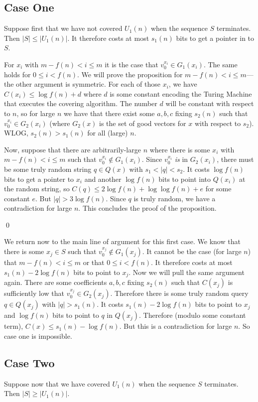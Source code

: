 \documentclass{article}
\begin{document}
\subsection{Case One} Suppose first that we have not covered $U_1(n)$ when the sequence $S$ terminates. Then $|S| \leq |U_1(n)|$. It therefore costs at most $s_1(n)$ bits to get a pointer in to $S$. 

\propnonum For $x_i$ with $m - f(n) < i \leq m$ it is the case that $v_0^{x_i} \in G_1(x_i)$. The same holds for $0 \leq i < f(n)$.
\proof 
We will prove the proposition for $m - f(n) < i \leq m$---the other argument is symmetric. For each of those $x_i$, we have $C(x_i) \leq \log f(n) + d$ where $d$ is some constant encoding the Turing Machine that executes the covering algorithm. The number $d$ will be constant with respect to $n$, so for large $n$ we have that there exist some $a,b,c$ fixing $s_2(n)$ such that $v_0^{x_i} \in G_2(x_i)$ (where $G_2(x)$ is the set of good vectors for $x$ with respect to $s_2$). WLOG, $s_2(n) > s_1(n)$ for all (large) $n$. 

Now, suppose that there are arbitrarily-large $n$ where there is some $x_i$ with $m - f(n) < i \leq m$ such that $v_0^{x_i} \notin G_1(x_i)$. Since $v_0^{x_i}$ \emph{is} in $G_2(x_i)$, there must be some truly random string $q \in Q(x)$ with $s_1 < |q| < s_2$. It costs $\log f(n)$ bits to get a pointer to $x_i$ and another $\log f(n)$ bits to point into $Q(x_i)$ at the random string, so $C(q) \leq 2 \log f(n) + \log \log f(n) + e$ for some constant $e$. But $|q| > 3 \log f(n)$. Since $q$ is truly random, we have a contradiction for large $n$. This concludes the proof of the proposition. 

\qed

We return now to the main line of argument for this first case. We know that there is some $x_j \in S$ such that $v_0^{x_j} \notin G_1(x_j)$. It cannot be the case (for large $n$) that $m - f(n) < i \leq m$ or that $0 \leq i < f(n)$. It therefore costs at most $s_1(n) - 2\log f(n)$ bits to point to $x_j$. Now we will pull the same argument again. There are some coefficients $a,b,c$ fixing $s_2(n)$ such that $C(x_j)$ is sufficiently low that $v_0^{x_j} \in G_2(x_j)$. Therefore there is some truly random query $q \in Q(x_j)$ with $|q| > s_1(n)$. It costs $s_1(n) - 2\log f(n)$ bits to point to $x_j$ and $\log f(n)$ bits to point to $q$ in $Q(x_j)$. Therefore (modulo some constant term), $C(x) \leq s_1(n) - \log f(n)$. But this is a contradiction for large $n$. So case one is impossible. 

\subsection{Case Two}
Suppose now that we have covered $U_1(n)$ when the sequence $S$ terminates. Then $|S| \geq |U_1(n)|$. 
\end{document}
